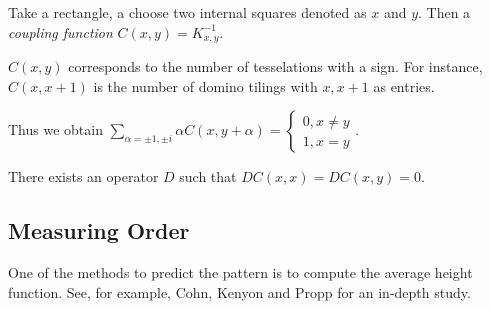 \documentclass[11pt]{scrartcl}
\begin{document}
  \begin{definition}

    Take a rectangle, a choose two internal squares denoted as $x$ and
    $y$. Then a \textit{coupling function} $C(x, y) =K^{-1}_{x, y}$.
  \end{definition}
  \begin{note*}
    $C(x, y)$ corresponds to the number of tesselations with a sign.
    For instance, $C(x, x+1)$ is the number of domino tilings with $x, x+1$ as entries.
  \end{note*}

  Thus we obtain
  $\sum_{\alpha = \pm 1, \pm i} \alpha C(x, y+\alpha) = \begin{cases}
    0, x\neq y\\
    1, x=y
  \end{cases}$.

  There exists an operator $D$ such that $D C(x, x) = D C(x, y) = 0$.

  \subsection{Measuring Order}

  One of the methods to predict the pattern is to compute the average
  height function. See, for example, Cohn, Kenyon and Propp for an in-depth
  study.
  
\end{document}
